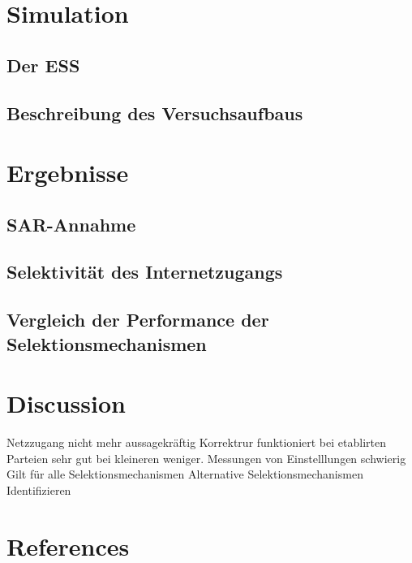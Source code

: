 \documentclass[a4paper , 11pt]{article}
\begin{document}
\section{Simulation}
\subsection{Der ESS}
\subsection{Beschreibung des Versuchsaufbaus}

\section{Ergebnisse}
\subsection{SAR-Annahme}
\subsection{Selektivität des Internetzugangs}
\subsection{Vergleich der Performance der Selektionsmechanismen}

\section{Discussion}
Netzzugang nicht mehr aussagekräftig
Korrektrur funktioniert bei etablirten Parteien sehr gut bei kleineren weniger.
Messungen von Einstelllungen schwierig
Gilt für alle Selektionsmechanismen 
Alternative Selektionsmechanismen Identifizieren


\newpage


\section*{References}
\end{document}
